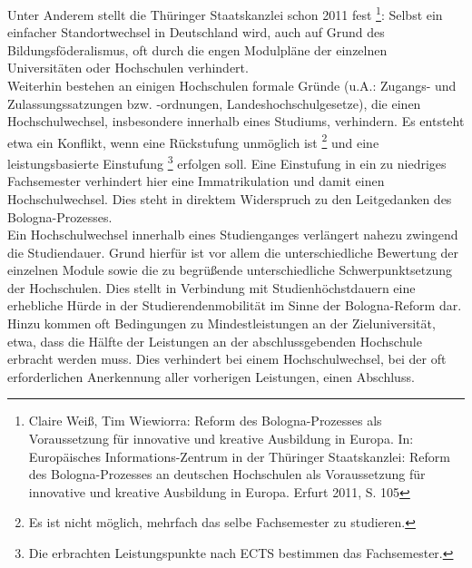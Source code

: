         Unter Anderem stellt die Thüringer Staatskanzlei schon 2011 fest \footnote{Claire Weiß, Tim Wiewiorra: Reform des Bologna-Prozesses als Voraussetzung für innovative und kreative Ausbildung in Europa.
        In: Europäisches Informations-Zentrum in der Thüringer Staatskanzlei: Reform des Bologna-Prozesses an deutschen Hochschulen als Voraussetzung für innovative und kreative Ausbildung in Europa. Erfurt 2011, S. 105}:
        \flqq Selbst ein einfacher Standortwechsel in Deutschland wird, auch auf Grund des Bildungsföderalismus, oft durch die engen Modulpläne der einzelnen Universitäten oder Hochschulen verhindert. \frqq \\

        Weiterhin bestehen an einigen Hochschulen formale Gründe (u.A.: Zugangs- und Zulassungssatzungen bzw. -ordnungen, Landeshochschulgesetze), die einen Hochschulwechsel, insbesondere innerhalb eines Studiums, verhindern.
        Es entsteht etwa ein Konflikt, wenn eine Rückstufung unmöglich ist \footnote{Es ist nicht möglich, mehrfach das selbe Fachsemester zu studieren.} und eine leistungsbasierte Einstufung \footnote{Die erbrachten Leistungspunkte nach ECTS bestimmen das Fachsemester.} erfolgen soll.
        Eine Einstufung in ein zu niedriges Fachsemester verhindert hier eine Immatrikulation und damit einen Hochschulwechsel. Dies steht in direktem Widerspruch zu den Leitgedanken des Bologna-Prozesses. \\

        Ein Hochschulwechsel innerhalb eines Studienganges verlängert nahezu zwingend die Studiendauer. Grund hierfür ist vor allem die unterschiedliche Bewertung der einzelnen Module sowie die zu begrüßende unterschiedliche Schwerpunktsetzung der Hochschulen. Dies stellt in Verbindung mit Studienhöchstdauern eine erhebliche Hürde in der Studierendenmobilität im Sinne der Bologna-Reform dar. \\

        Hinzu kommen oft Bedingungen zu Mindestleistungen an der Zieluniversität, etwa,  dass die Hälfte der Leistungen an der abschlussgebenden Hochschule erbracht werden muss.
        Dies verhindert bei einem Hochschulwechsel, bei der oft erforderlichen Anerkennung aller vorherigen Leistungen, einen Abschluss. \\

